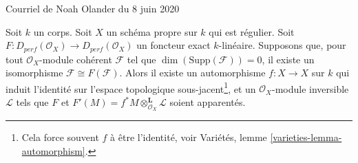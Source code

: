 \begin{lemma}
\label{lemma-noah}
\begin{reference}
Courriel de Noah Olander du 8 juin 2020
\end{reference}
Soit $k$ un corps. Soit $X$ un schéma propre sur $k$ qui est régulier.
Soit $F : D_{perf}(\mathcal{O}_X) \to D_{perf}(\mathcal{O}_X)$
un foncteur exact $k$-linéaire. Supposons que, pour tout
$\mathcal{O}_X$-module cohérent $\mathcal{F}$ tel que $\dim(\text{Supp}(\mathcal{F})) = 0$,
il existe un isomorphisme $\mathcal{F} \cong F(\mathcal{F})$.
Alors il existe un automorphisme $f : X \to X$ sur $k$
qui induit l'identité
sur l'espace topologique sous-jacent\footnote{Cela force souvent $f$
à être l'identité, voir Variétés, lemme \ref{varieties-lemma-automorphism}.},
et un $\mathcal{O}_X$-module inversible $\mathcal{L}$
tels que $F$ et $F'(M) = f^*M \otimes_{\mathcal{O}_X}^\mathbf{L} \mathcal{L}$
soient apparentés.
\end{lemma}

